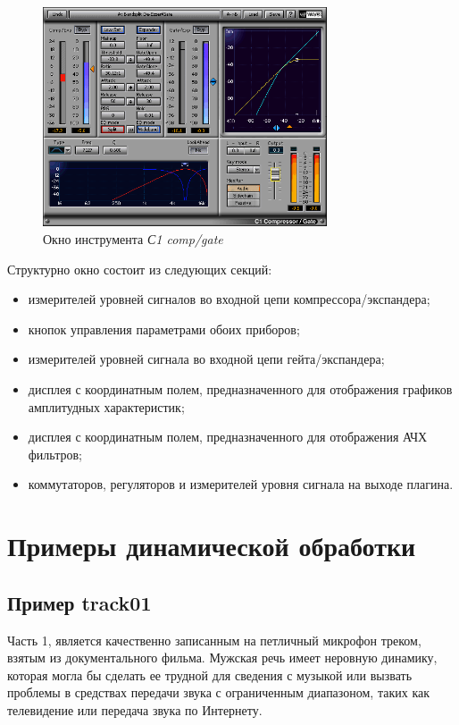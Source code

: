 \documentclass[oneside, final, 14pt]{extreport}
\begin{document}
\begin{figure}[ht!]
  \centering
  \includegraphics[width=0.75\textwidth]{pic-wavescomp-07}
  \caption{Окно инструмента \emph{С1 comp/gate}}
  \label{pic-wavescomp-07}
\end{figure}

Структурно окно состоит из следующих секций:
\begin{itemize}
  \item измерителей уровней сигналов во входной цепи компрессора/экспандера;
  \item кнопок управления параметрами обоих приборов;
  \item измерителей уровней сигнала во входной цепи гейта/экспандера;
  \item дисплея с координатным полем, предназначенного для отображения графиков амплитудных характеристик;
  \item дисплея с координатным полем, предназначенного для отображения АЧХ фильтров;
  \item коммутаторов, регуляторов и измерителей уровня сигнала на выходе плагина.
\end{itemize}

\section{Примеры динамической обработки}
\subsection{Пример track01}
Часть 1, является качественно записанным на петличный микрофон треком, взятым из документального фильма. Мужская речь имеет неровную динамику, которая могла бы сделать ее трудной для сведения с музыкой или вызвать проблемы в средствах передачи звука с ограниченным диапазоном, таких как телевидение или передача звука по Интернету.
\end{document}

